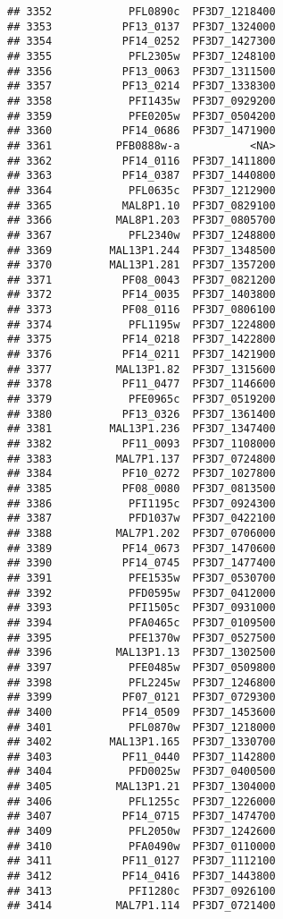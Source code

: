 \documentclass{article}\usepackage[]{graphicx}\usepackage[]{color}
\makeatletter
\newenvironment{kframe}{%
 \def\at@end@of@kframe{}%
 \ifinner\ifhmode%
  \def\at@end@of@kframe{\end{minipage}}%
  \begin{minipage}{\columnwidth}%
 \fi\fi%
 \def\FrameCommand##1{\hskip\@totalleftmargin \hskip-\fboxsep
 \colorbox{shadecolor}{##1}\hskip-\fboxsep
     \hskip-\linewidth \hskip-\@totalleftmargin \hskip\columnwidth}%
 \MakeFramed {\advance\hsize-\width
   \@totalleftmargin\z@ \linewidth\hsize
   \@setminipage}}%
 {\par\unskip\endMakeFramed%
 \at@end@of@kframe}
\newenvironment{knitrout}{}{} %
\makeatother
\begin{document}
\begin{knitrout}
\begin{kframe}
\begin{verbatim}
## 3352            PFL0890c  PF3D7_1218400
## 3353           PF13_0137  PF3D7_1324000
## 3354           PF14_0252  PF3D7_1427300
## 3355            PFL2305w  PF3D7_1248100
## 3356           PF13_0063  PF3D7_1311500
## 3357           PF13_0214  PF3D7_1338300
## 3358            PFI1435w  PF3D7_0929200
## 3359            PFE0205w  PF3D7_0504200
## 3360           PF14_0686  PF3D7_1471900
## 3361          PFB0888w-a           <NA>
## 3362           PF14_0116  PF3D7_1411800
## 3363           PF14_0387  PF3D7_1440800
## 3364            PFL0635c  PF3D7_1212900
## 3365           MAL8P1.10  PF3D7_0829100
## 3366          MAL8P1.203  PF3D7_0805700
## 3367            PFL2340w  PF3D7_1248800
## 3369         MAL13P1.244  PF3D7_1348500
## 3370         MAL13P1.281  PF3D7_1357200
## 3371           PF08_0043  PF3D7_0821200
## 3372           PF14_0035  PF3D7_1403800
## 3373           PF08_0116  PF3D7_0806100
## 3374            PFL1195w  PF3D7_1224800
## 3375           PF14_0218  PF3D7_1422800
## 3376           PF14_0211  PF3D7_1421900
## 3377          MAL13P1.82  PF3D7_1315600
## 3378           PF11_0477  PF3D7_1146600
## 3379            PFE0965c  PF3D7_0519200
## 3380           PF13_0326  PF3D7_1361400
## 3381         MAL13P1.236  PF3D7_1347400
## 3382           PF11_0093  PF3D7_1108000
## 3383          MAL7P1.137  PF3D7_0724800
## 3384           PF10_0272  PF3D7_1027800
## 3385           PF08_0080  PF3D7_0813500
## 3386            PFI1195c  PF3D7_0924300
## 3387            PFD1037w  PF3D7_0422100
## 3388          MAL7P1.202  PF3D7_0706000
## 3389           PF14_0673  PF3D7_1470600
## 3390           PF14_0745  PF3D7_1477400
## 3391            PFE1535w  PF3D7_0530700
## 3392            PFD0595w  PF3D7_0412000
## 3393            PFI1505c  PF3D7_0931000
## 3394            PFA0465c  PF3D7_0109500
## 3395            PFE1370w  PF3D7_0527500
## 3396          MAL13P1.13  PF3D7_1302500
## 3397            PFE0485w  PF3D7_0509800
## 3398            PFL2245w  PF3D7_1246800
## 3399           PF07_0121  PF3D7_0729300
## 3400           PF14_0509  PF3D7_1453600
## 3401            PFL0870w  PF3D7_1218000
## 3402         MAL13P1.165  PF3D7_1330700
## 3403           PF11_0440  PF3D7_1142800
## 3404            PFD0025w  PF3D7_0400500
## 3405          MAL13P1.21  PF3D7_1304000
## 3406            PFL1255c  PF3D7_1226000
## 3407           PF14_0715  PF3D7_1474700
## 3409            PFL2050w  PF3D7_1242600
## 3410            PFA0490w  PF3D7_0110000
## 3411           PF11_0127  PF3D7_1112100
## 3412           PF14_0416  PF3D7_1443800
## 3413            PFI1280c  PF3D7_0926100
## 3414          MAL7P1.114  PF3D7_0721400

\end{verbatim}
\end{kframe}
\end{knitrout}
\end{document}
